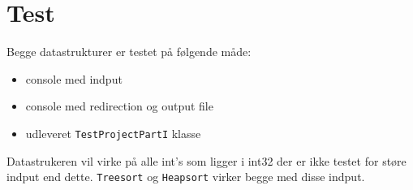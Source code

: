 \documentclass{article}
\begin{document}
\section*{Test}
Begge datastrukturer er testet på følgende måde:
\begin{itemize}
  \item console med indput
  \item console med redirection og output file  
  \item udleveret \texttt{TestProjectPartI} klasse
\end{itemize}
\bigskip
Datastrukeren vil virke på alle int's som ligger i int32 der er ikke testet for støre indput end dette. \texttt{Treesort} og \texttt{Heapsort} virker begge med disse indput.
\end{document}
